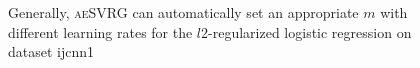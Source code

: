 \documentclass[conference]{IEEEtran}
\begin{document}
 \begin{figure}[ht]
\centering
{}

\caption{Generally, \textsc{aeSVRG} can automatically set an appropriate $m$ with different learning rates for the $l2$-regularized logistic regression on dataset ijcnn1}
\label{figure_logistic_ijcnn1}
\end{figure}
\end{document}
